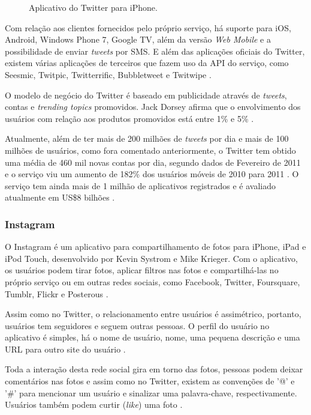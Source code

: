 \documentclass[diss]{template/setrem}
\begin{document}
\begin{figure}[!h]
    \caption{Aplicativo do Twitter para iPhone.}
    \label{fig:twitter-iphone}
\end{figure}

Com relação aos clientes fornecidos pelo próprio serviço, há suporte para iOS, Android, Windows Phone 7, Google TV, além da versão \emph{Web Mobile} e a possibilidade de enviar \emph{tweets} por SMS. E além das aplicações oficiais do Twitter, existem várias aplicações de terceiros que fazem uso da API do serviço, como Seesmic, Twitpic, Twitterrific, Bubbletweet e Twitwipe \citep{Twitter2012b}.

O modelo de negócio do Twitter é baseado em publicidade através de \emph{tweets}, contas e \emph{trending topics} promovidos. Jack Dorsey afirma que o envolvimento dos usuários com relação aos produtos promovidos está entre 1\% e 5\% \citep{Wauters2012}.

Atualmente, além de ter mais de 200 milhões de \emph{tweets} por dia e mais de 100 milhões de usuários, como fora comentado anteriormente, o Twitter tem obtido uma média de 460 mil novas contas por dia, segundo dados de Fevereiro de 2011 e o serviço viu um aumento de 182\% dos usuários móveis de 2010 para 2011 \citep{Twitter2011}. O serviço tem ainda mais de 1 milhão de aplicativos registrados e é avaliado atualmente em US\$8 bilhões \citep{Rushe2011}.

\subsubsection{Instagram}
O Instagram é um aplicativo para compartilhamento de fotos para iPhone, iPad e iPod Touch, desenvolvido por Kevin Systrom e Mike Krieger. Com o aplicativo, os usuários podem tirar fotos, aplicar filtros nas fotos e compartilhá-las no próprio serviço ou em outras redes sociais, como Facebook, Twitter, Foursquare, Tumblr, Flickr e Posterous \citep{CrunchBase2012c}.

Assim como no Twitter, o relacionamento entre usuários é assimétrico, portanto, usuários tem seguidores e seguem outras pessoas. O perfil do usuário no aplicativo é simples, há o nome de usuário, nome, uma pequena descrição e uma URL para outro site do usuário \citep{Instagram2012}.

Toda a interação desta rede social gira em torno das fotos, pessoas podem deixar comentários nas fotos e assim como no Twitter, existem as convenções de '@' e '\#' para mencionar um usuário e sinalizar uma palavra-chave, respectivamente. Usuários também podem curtir (\emph{like}) uma foto \citep{Instagram2012}.
\end{document}

